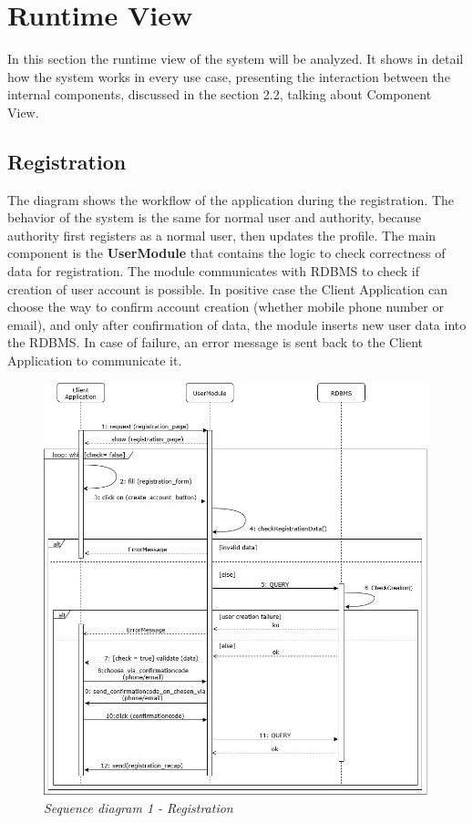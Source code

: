 \section{Runtime View}
In this section the runtime view of the system will be analyzed. It shows in detail how the system works in every use case, 
presenting the interaction between the internal components, discussed in the section 2.2, talking about Component View.

\subsection{Registration}
The diagram shows the workflow of the application during the registration. The behavior of 
the system is the same for normal user and authority, because authority first registers as a normal user, then updates the profile. The main 
component is the \textbf{UserModule} that contains the logic to check correctness of data for registration. The module communicates with RDBMS
to check if creation of user account is possible. In positive case the Client Application can choose the way to confirm account creation (whether
mobile phone number or email), and only after confirmation of data, the module inserts new user data into the RDBMS. In case of failure, an error 
message is sent back to the Client Application to communicate it. 

\begin{figure}[H]
  \centering
  \includegraphics[origin=c,width=\textwidth]{DD_Images/RunTimeView/1.jpg}
  \caption{\textit{Sequence diagram 1 - Registration}}
\end{figure}

